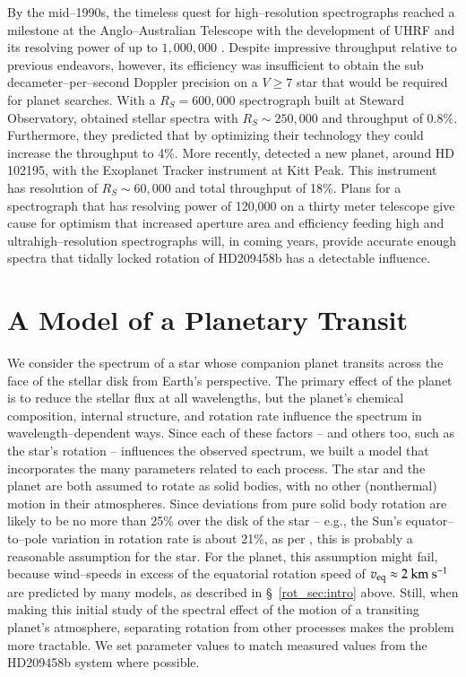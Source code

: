 By the mid--1990s, the timeless quest for high--resolution
spectrographs reached a milestone at the Anglo--Australian Telescope
with the development of UHRF and its resolving power of up to
$1,000,000$ \citep{diego_et_al1995}.  Despite impressive throughput
relative to previous endeavors, however, its efficiency was
insufficient to obtain the sub decameter--per--second Doppler
precision on a $V \ge 7$ star that would be required for planet
searches.  With a $R_S = 600,000$ spectrograph built at Steward
Observatory, \citet{ge_et_al2002} obtained stellar spectra with $R_S
\sim 250,000$ and throughput of 0.8\%.  Furthermore, they predicted
that by optimizing their technology they could increase the throughput
to 4\%.  More recently, \citet{ge_et_al2006} detected a new planet,
around HD 102195, with the Exoplanet Tracker instrument at Kitt Peak.
This instrument has resolution of $R_S \sim 60,000$ and total
throughput of 18\%.  Plans for a spectrograph that has resolving power
of 120,000 on a thirty meter telescope \citep{tokunaga_et_al2006} give
cause for optimism that increased aperture area and efficiency feeding
high and ultrahigh--resolution spectrographs will, in coming years,
provide accurate enough spectra that tidally locked rotation of
HD209458b has a detectable influence.



\section{A Model of a Planetary Transit}
\label{rot_sec:model}
We consider the spectrum of a star whose companion planet transits
across the face of the stellar disk from Earth's perspective.  The
primary effect of the planet is to reduce the stellar flux at all
wavelengths, but the planet's chemical composition, internal
structure, and rotation rate influence the spectrum in
wavelength--dependent ways.  Since each of these factors -- and others
too, such as the star's rotation -- influences the observed spectrum,
we built a model that incorporates the many parameters related to each
process.  The star and the planet are both assumed to rotate as solid
bodies, with no other (nonthermal) motion in their atmospheres.  Since
deviations from pure solid body rotation are likely to be no more than
25\% over the disk of the star -- e.g., the Sun's equator--to--pole
variation in rotation rate is about 21\%, as per
\citet{howard_et_al1984}, this is probably a reasonable assumption for
the star.  For the planet, this assumption might fail, because
wind--speeds in excess of the equatorial rotation speed of $v_{\rm eq}
\approx 2 {\rm ~km~s^{-1}}$ are predicted by many models, as described
in \S~\ref{rot_sec:intro} above.  Still, when making this initial
study of the spectral effect of the motion of a transiting planet's
atmosphere, separating rotation from other processes makes the problem
more tractable.  We set parameter values to match measured values from
the HD209458b system where possible.

